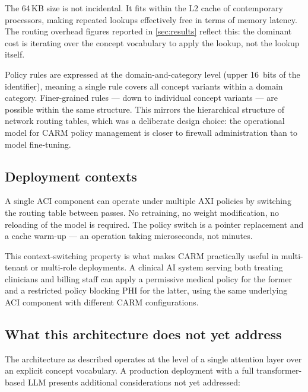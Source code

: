 \documentclass[11pt,a4paper]{article}
\theoremstyle{definition}
\begin{document}
The 64\,KB size is not incidental. It fits within the L2 cache of contemporary
processors, making repeated lookups effectively free in terms of memory latency. The
routing overhead figures reported in \cref{sec:results} reflect this: the dominant
cost is iterating over the concept vocabulary to apply the lookup, not the lookup
itself.

Policy rules are expressed at the domain-and-category level (upper 16~bits of the
identifier), meaning a single rule covers all concept variants within a domain
category. Finer-grained rules --- down to individual concept variants --- are
possible within the same structure. This mirrors the hierarchical structure of
network routing tables, which was a deliberate design choice: the operational model
for CARM policy management is closer to firewall administration than to model
fine-tuning.

\subsection{Deployment contexts}

A single ACI component can operate under multiple AXI policies by switching the
routing table between passes. No retraining, no weight modification, no reloading of
the model is required. The policy switch is a pointer replacement and a cache
warm-up --- an operation taking microseconds, not minutes.

This context-switching property is what makes CARM practically useful in
multi-tenant or multi-role deployments. A clinical AI system serving both treating
clinicians and billing staff can apply a permissive medical policy for the former and
a restricted policy blocking PHI for the latter, using the same underlying ACI
component with different CARM configurations.

\subsection{What this architecture does not yet address}
\label{sec:openarch}

The architecture as described operates at the level of a single attention layer over
an explicit concept vocabulary. A production deployment with a full transformer-based
LLM presents additional considerations not yet addressed:
\end{document}
